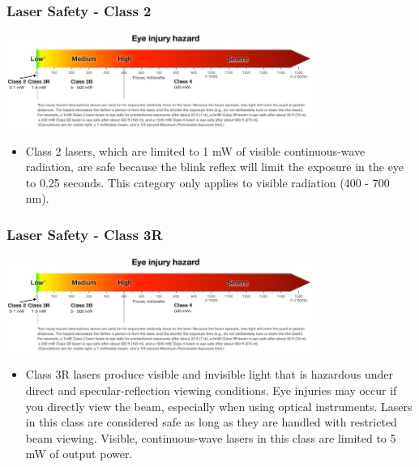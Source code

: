 \documentclass{beamer}
\begin{document}
\begin{frame}\frametitle{Laser Safety - Class 2}
\begin{center}
\includegraphics[width=10cm]{fig/lsafe.png}
\end{center}
\begin{itemize}
\item Class 2 lasers, which are limited to 1 mW of visible continuous-wave radiation, are safe because the blink reflex will limit the exposure in the eye to 0.25 seconds. This category only applies to visible radiation (400 - 700 nm).
\end{itemize}
\end{frame}

\begin{frame}\frametitle{Laser Safety - Class 3R}
\begin{center}
\includegraphics[width=10cm]{fig/lsafe.png}
\end{center}
\begin{itemize}
\item Class 3R lasers produce visible and invisible light that is hazardous under direct and specular-reflection viewing conditions. Eye injuries may occur if you directly view the beam, especially when using optical instruments. Lasers in this class are considered safe as long as they are handled with restricted beam viewing. Visible, continuous-wave lasers in this class are limited to 5 mW of output power.
\end{itemize}
\end{frame}
\end{document}
